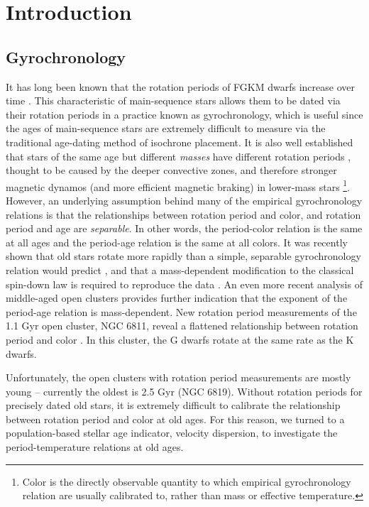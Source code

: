 \section{Introduction}

\subsection{Gyrochronology}
It has long been known that the rotation periods of FGKM dwarfs increase over
time \citep{skumanich1972}.
This characteristic of main-sequence stars allows them to be dated via their
rotation periods in a practice known as gyrochronology, which is useful
since the ages of main-sequence stars are extremely difficult to measure via
the traditional age-dating method of isochrone placement.
It is also well established that stars of the same age but different {\it
masses} have different rotation periods , thought to be
caused by the deeper convective zones, and therefore stronger magnetic dynamos
(and more efficient magnetic braking) in lower-mass stars
\footnote{Color is the directly observable quantity to which empirical
gyrochronology relation are usually calibrated to, rather than mass or
effective temperature.}.
However, an underlying assumption behind many of the empirical gyrochronology
relations \citep[\eg][]{barnes2003, barnes2007, mamajek2008, meibom2011,
angus2015, angus2019} is that the relationships between rotation period and
color, and rotation period and age are {\it separable}.
In other words, the period-color relation is the same at all ages and the
period-age relation is the same at all colors.
It was recently shown that old stars rotate more rapidly than a simple,
separable gyrochronology relation would predict \citep{angus2015,
vansaders2016, vansaders2018, metcalfe2019}, and that a mass-dependent
modification to the classical \citet{skumanich1972} spin-down law is required
to reproduce the data \citep{vansaders2016, vansaders2018}.
An even more recent analysis of middle-aged open clusters provides further
indication that the exponent of the period-age relation is mass-dependent.
New rotation period measurements of the 1.1 Gyr open cluster, NGC 6811,
reveal a flattened relationship between rotation period and color
\citep{curtis2019}.
In this cluster, the G dwarfs rotate at the same rate as the K dwarfs.

Unfortunately, the open clusters with rotation period measurements are mostly
young -- currently the oldest is 2.5 Gyr (NGC 6819).
Without rotation periods for precisely dated old stars, it is extremely
difficult to calibrate the relationship between rotation period and color at
old ages.
For this reason, we turned to a population-based stellar age indicator,
velocity dispersion, to investigate the period-temperature relations at old
ages.

